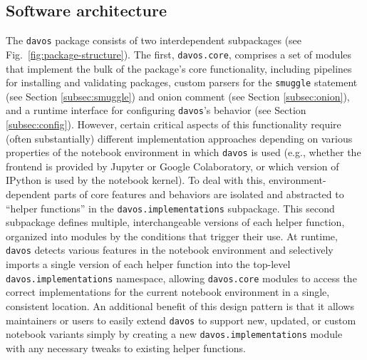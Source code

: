 \documentclass[preprint,12pt,a4paper]{elsarticle}
\newcommand{\comment}[1]{}
\begin{document}
\subsection{Software architecture}
The \texttt{davos} package consists of two interdependent subpackages (see Fig.~\ref{fig:package-structure}). The first, \texttt{davos.core}, comprises a set of modules that implement\comment{provide?} the bulk of the package's core functionality, including pipelines for installing and validating packages, custom parsers for the \texttt{smuggle} statement (see Section \ref{subsec:smuggle}) and onion comment (see Section \ref{subsec:onion}), and a runtime interface for configuring \texttt{davos}'s behavior (see Section \ref{subsec:config}). However, certain critical\comment{other important} aspects of this functionality require (often substantially) different implementation approaches depending on various properties of the notebook environment in which \texttt{davos} is used (e.g., whether the frontend is provided by Jupyter or Google Colaboratory, or which version of IPython \cite{PereGran07} is used by the notebook kernel). To deal with this, environment-dependent parts of core features and behaviors are isolated and abstracted to ``helper functions'' in the \texttt{davos.implementations} subpackage. This second subpackage defines multiple, interchangeable versions of each helper function, organized into\comment{per-environment} modules by the conditions that trigger their use. At runtime, \texttt{davos} detects various features in the notebook environment and selectively imports a single version of each helper function into the top-level \texttt{davos.implementations} namespace, allowing \texttt{davos.core} modules to access the correct implementations for the current notebook environment in a single, consistent location. An additional benefit of this design pattern is that it allows maintainers or users to easily extend \texttt{davos} to support new, updated, or custom notebook variants simply by creating a new \texttt{davos.implementations} module with any necessary tweaks to existing helper functions.


\comment{
- js_functions.py?
- how parser is registered and deregistered?
- stub files?
- test suite?
- packaged with new PEP \_\_\_ standard (pyproject.toml + setup.cfg; no setup.py)?
}
\end{document}
